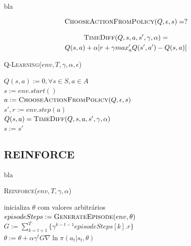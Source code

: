 \documentclass[letterpaper]{article}
\begin{document}
bla

\begin{equation} \label{eq:epsilon_greedy_action}
  \textsc{ChooseActionFromPolicy}(Q, \epsilon, s) = ?
\end{equation}

\begin{multline} \label{eq:time_diff_update_q_learning}
  \textsc{TimeDiff}(Q, s, a, s', \gamma, \alpha) = \\ 
      Q(s,a) + \alpha [r + \gamma max_a' Q(s', a') - Q(s,a)]
\end{multline}

\linesnumbered
\dontprintsemicolon
\begin{algorithm}[t!]
{
	\caption{\textsc{Q-Learning}($ env, T, \gamma, \alpha, \epsilon $)}
	\label{alg:q-learning}
    $Q(s,a) := 0, \forall s \in S, a \in A $\\

    {
      $s := env.start()$\\

      {
        $a := \textsc{ChooseActionFromPolicy}(Q, \epsilon, s) $\\
        $s', r := env.step(a)$\\
        $Q(s, a) = \textsc{TimeDiff}(Q, s, a, s', \gamma, \alpha)$\\
        $s := s'$ \\
      }
    }

}
\end{algorithm}

\subsection{REINFORCE}

bla


\linesnumbered
\dontprintsemicolon
\begin{algorithm}[t!]
{
	\caption{\textsc{Reinforce}($ env, T, \gamma, \alpha $)}
	\label{alg:reinforce}
    inicializa $ \theta $ com valores arbitrários \\

    {
      $episodeSteps := \textsc{GenerateEpisode}(env, \theta)$\\

      {
        $G := \sum_{k = t+1}^T \{ \gamma^{k-t-1} episodeSteps[k].r \}$\\
        $ \theta := \theta + \alpha \gamma^t G \nabla \ln \pi(a_t|s_t, \theta) $
      }
    }
}
\end{algorithm}
\end{document}
